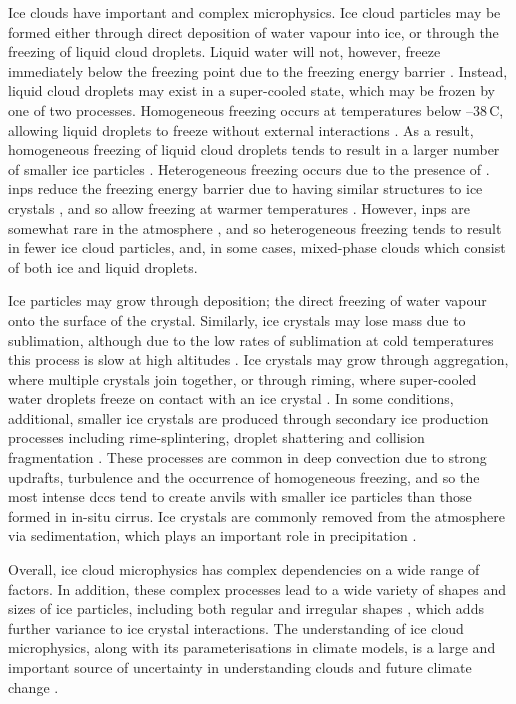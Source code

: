 Ice clouds have important and complex microphysics.
Ice cloud particles may be formed either through direct deposition of water vapour into ice, or through the freezing of liquid cloud droplets.
Liquid water will not, however, freeze immediately below the freezing point due to the freezing energy barrier \citep{heymsfield_homogeneous_1993}.
Instead, liquid cloud droplets may exist in a super-cooled state, which may be frozen by one of two processes.
Homogeneous freezing occurs at temperatures below --38\,\textdegree C, allowing liquid droplets to freeze without external interactions \citep{koop_water_2000}.
As a result, homogeneous freezing of liquid cloud droplets tends to result in a larger number of smaller ice particles \citep{karcher_parameterization_2002, ickes_classical_2015}.
Heterogeneous freezing occurs due to the presence of  \citep{kanji_overview_2017a}.
\acrshort{inp}s reduce the freezing energy barrier due to having similar structures to ice crystals \citep{hoose_heterogeneous_2012}, and so allow freezing at warmer temperatures \citep{karcher_roles_2003}.
However, \acrshort{inp}s are somewhat rare in the atmosphere \citep{burrows_icenucleating_2022a}, and so heterogeneous freezing tends to result in fewer ice cloud particles, and, in some cases, mixed-phase clouds which consist of both ice and liquid droplets.

Ice particles may grow through deposition; the direct freezing of water vapour onto the surface of the crystal.
Similarly, ice crystals may lose mass due to sublimation, although due to the low rates of sublimation at cold temperatures this process is slow at high altitudes \citep{seeley_formation_2019}.
Ice crystals may grow through aggregation, where multiple crystals join together, or through riming, where super-cooled water droplets freeze on contact with an ice crystal \citep{taylor_observations_2016}.
In some conditions, additional, smaller ice crystals are produced through secondary ice production processes including rime-splintering, droplet shattering and collision fragmentation \citep{field_secondary_2017a}.
These processes are common in deep convection due to strong updrafts, turbulence and the occurrence of homogeneous freezing, and so the most intense \acrshort{dcc}s tend to create anvils with smaller ice particles than those formed in in-situ cirrus.
Ice crystals are commonly removed from the atmosphere via sedimentation, which plays an important role in precipitation \citep{mulmenstadt_frequency_2015}.

Overall, ice cloud microphysics has complex dependencies on a wide range of factors.
In addition, these complex processes lead to a wide variety of shapes and sizes of ice particles, including both regular and irregular shapes \citep{waitz_situ_2022}, which adds further variance to ice crystal interactions.
The understanding of ice cloud microphysics, along with its parameterisations in climate models, is a large and important source of uncertainty in understanding clouds and future climate change \citep{sullivan_ice_2021, gasparini_opinion_2023}.


